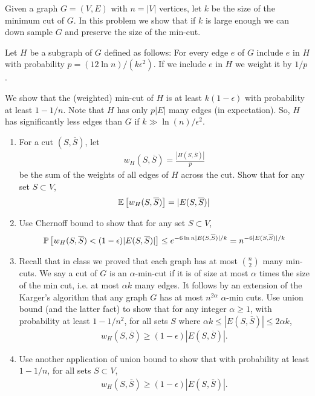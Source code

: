 \documentclass[10pt]{article}
\begin{document}
\begin{problem}[Problem 3]
    Given a graph \( G = (V,E) \) with \( n = |V| \) vertices, let \( k \) be the size of the minimum cut of \( G \). In this problem we show that if \( k \) is large enough we can down sample \( G \) and preserve the size of the min-cut. 

    Let \( H \) be a subgraph of \( G \) defined as follows: For every edge \( e \) of \( G \) include \( e \) in \( H \) with probability \( p = (12\ln n)/ (k\epsilon^2) \). If we include \( e \) in \( H \) we weight it by \( 1/p \). 

    We show that the (weighted) min-cut of \( H \) is at least \( k(1-\epsilon) \) with probability at least \( 1-1/n \). Note that \( H \) has only \( p|E| \) many edges (in expectation). So, \( H \) has significantly less edges than \( G \) if \( k\gg \ln(n)/\epsilon^2 \).

\begin{enumerate}[nolistsep,label=(\alph*)]
    \item For a cut \( (S,\overline{S}) \), let
        \begin{align*}
            w_H(S,\overline{S}) = \frac{|H(S,\overline{S})|}{p}
        \end{align*}
        be the sum of the weights of all edges of \( H \) across the cut. Show that for any set \( S\subset V \), 
        \begin{align*}
            \mathbb{E} \left[ w_H(S,\overline{S}) \right] = |E(S,\overline{S})|
        \end{align*}
    \item Use Chernoff bound to show that for any set \( S\subset V \),
        \begin{align*}
            \mathbb{P} \left[ w_H(S,\overline{S}) < (1-\epsilon) | E(S,\overline{S}) | \right] \leq e^{-6\ln n | E(S,\overline{S})|/k} = n^{-6|E(S,\overline{S})|/k}
        \end{align*}
    \item Recall that in class we proved that each graph has at most \( \binom{n}{2} \) many min-cuts. We say a cut of \( G \) is an \( \alpha \)-min-cut if it is of size at most \( \alpha \) times the size of the min cut, i.e. at most \( \alpha k \) many edges. 
        It follows by an extension of the Karger’s algorithm that any graph \( G \) has at most \( n^{2 \alpha} \) \( \alpha \)-min cuts.
        Use union bound (and the latter fact) to show that for any integer \( \alpha \geq 1 \), with probability at least \( 1-1/n^2 \), for all sets \( S \) where \( \alpha k \leq |E(S,\overline{S})|\leq 2 \alpha k \),
        \begin{align*}
            w_H(S,\overline{S}) \geq (1-\epsilon)|E(S,\overline{S})|.
        \end{align*}
    \item Use another application of union bound to show that with probability at least \( 1-1/n \), for all sets \( S\subset V \),
        \begin{align*}
            w_H(S,\overline{S}) \geq (1-\epsilon)|E(S,\overline{S})|.
        \end{align*}
\end{enumerate}
\end{problem}
\end{document}
